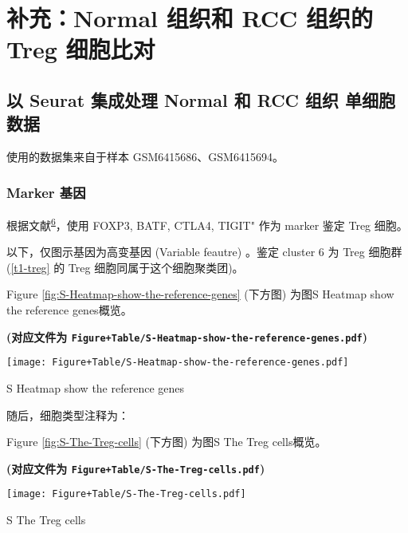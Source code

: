 \documentclass[
]{article}
\begin{document}
\hypertarget{ux8865ux5145normal-ux7ec4ux7ec7ux548c-rcc-ux7ec4ux7ec7ux7684-treg-ux7ec6ux80deux6bd4ux5bf9}{%
\section{补充：Normal 组织和 RCC 组织的 Treg 细胞比对}\label{ux8865ux5145normal-ux7ec4ux7ec7ux548c-rcc-ux7ec4ux7ec7ux7684-treg-ux7ec6ux80deux6bd4ux5bf9}}

\hypertarget{ux4ee5-seurat-ux96c6ux6210ux5904ux7406-normal-ux548c-rcc-ux7ec4ux7ec7-ux5355ux7ec6ux80deux6570ux636e}{%
\subsection{以 Seurat 集成处理 Normal 和 RCC 组织 单细胞数据}\label{ux4ee5-seurat-ux96c6ux6210ux5904ux7406-normal-ux548c-rcc-ux7ec4ux7ec7-ux5355ux7ec6ux80deux6570ux636e}}

使用的数据集来自于样本 GSM6415686、GSM6415694。

\hypertarget{marker-ux57faux56e0}{%
\subsubsection{Marker 基因}\label{marker-ux57faux56e0}}

根据文献\textsuperscript{\protect\hyperlink{ref-SingleCellSeqKrishn2021}{6}}，使用 FOXP3, BATF, CTLA4, TIGIT" 作为 marker 鉴定 Treg 细胞。

以下，仅图示基因为高变基因 (Variable feautre) 。鉴定 cluster 6 为 Treg 细胞群 (\ref{t1-treg} 的 Treg 细胞同属于这个细胞聚类团)。

Figure \ref{fig:S-Heatmap-show-the-reference-genes} (下方图) 为图S Heatmap show the reference genes概览。

\textbf{(对应文件为 \texttt{Figure+Table/S-Heatmap-show-the-reference-genes.pdf})}

\def\@captype{figure}
\begin{center}
\texttt{[image: Figure+Table/S-Heatmap-show-the-reference-genes.pdf]}
\caption{S Heatmap show the reference genes}\label{fig:S-Heatmap-show-the-reference-genes}
\end{center}

随后，细胞类型注释为：

Figure \ref{fig:S-The-Treg-cells} (下方图) 为图S The Treg cells概览。

\textbf{(对应文件为 \texttt{Figure+Table/S-The-Treg-cells.pdf})}

\def\@captype{figure}
\begin{center}
\texttt{[image: Figure+Table/S-The-Treg-cells.pdf]}
\caption{S The Treg cells}\label{fig:S-The-Treg-cells}
\end{center}
\end{document}
